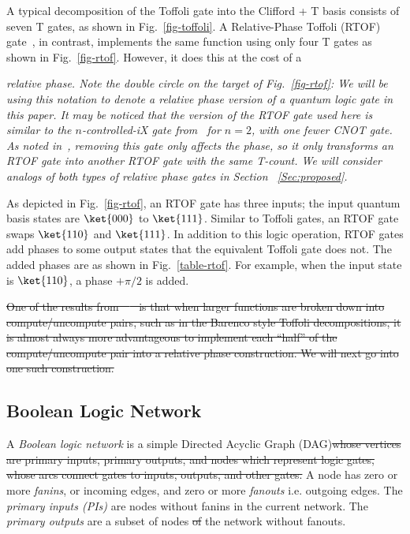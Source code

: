 \documentclass[paper]{ieice}
\providecommand{\DIFadd}[1]{{\protect\color{blue}{#1}}} %
\providecommand{\DIFdel}[1]{{\protect\color{red}\sout{#1}}}                      %
\providecommand{\DIFaddbegin}{} %
\providecommand{\DIFaddend}{} %
\providecommand{\DIFdelbegin}{} %
\providecommand{\DIFdelend}{} %
\newcommand{\DIFscaledelfig}{0.5}
\newlength{\DIFdelgraphicswidth} %
\newlength{\DIFdelgraphicsheight} %
\newcommand{\DIFaddincludegraphics}[2][]{{\color{blue}\fbox{\DIFOincludegraphics[#1]{#2}}}} %
\newcommand{\DIFdelincludegraphics}[2][]{%
\sbox{\DIFdelgraphicsbox}{\DIFOincludegraphics[#1]{#2}}%
\settoboxwidth{\DIFdelgraphicswidth}{\DIFdelgraphicsbox} %
\settoboxtotalheight{\DIFdelgraphicsheight}{\DIFdelgraphicsbox} %
\scalebox{\DIFscaledelfig}{%
\parbox[b]{\DIFdelgraphicswidth}{\usebox{\DIFdelgraphicsbox}\\[-\baselineskip] \rule{\DIFdelgraphicswidth}{0em}}\llap{\resizebox{\DIFdelgraphicswidth}{\DIFdelgraphicsheight}{%
\setlength{\unitlength}{\DIFdelgraphicswidth}%
\begin{picture}(1,1)%
\thicklines\linethickness{2pt} %
{\color[rgb]{1,0,0}\put(0,0){\framebox(1,1){}}}%
{\color[rgb]{1,0,0}\put(0,0){\line( 1,1){1}}}%
{\color[rgb]{1,0,0}\put(0,1){\line(1,-1){1}}}%
\end{picture}%
}\hspace*{3pt}}} %
} %
\DeclareRobustCommand{\DIFaddbegin}{\DIFOaddbegin \let\includegraphics\DIFaddincludegraphics} %
\DeclareRobustCommand{\DIFaddend}{\DIFOaddend \let\includegraphics\DIFOincludegraphics} %
\DeclareRobustCommand{\DIFdelbegin}{\DIFOdelbegin \let\includegraphics\DIFdelincludegraphics} %
\DeclareRobustCommand{\DIFdelend}{\DIFOaddend \let\includegraphics\DIFOincludegraphics} %
\begin{document}
A typical decomposition of the Toffoli gate into the Clifford + T basis
consists of seven T gates, as shown in Fig.~\ref{fig-toffoli}.
A Relative-Phase Toffoli (RTOF) gate~\cite{bib-rtof-maslov}, in contrast,
implements the same function using only four T gates as shown in
Fig.~\ref{fig-rtof}. However, it does this at the cost of a {\it{relative phase}.
Note the double circle on the target of Fig.~\ref{fig-rtof}: We will be
using this notation to denote a relative phase version of a quantum logic
gate in this paper. It may be noticed that the version of the RTOF gate used here is similar to the $n$-controlled-iX gate
from~\cite{bib-selinger-rtof} for $n=2$, with one fewer CNOT gate. As
noted in~\cite{bib-rtof-maslov}, removing this gate only affects the
phase, so it only transforms an RTOF gate into another RTOF gate with
the same T-count. We will consider analogs of both types of
relative phase gates in Section ~\ref{Sec:proposed}.

As depicted in Fig.~\ref{fig-rtof}, an RTOF gate has three inputs; the input quantum basis states are $\ket{000}$
to $\ket{111}$. Similar to Toffoli gates, an RTOF gate swaps $\ket{110}$ and $\ket{111}$. In addition to this
logic operation, RTOF gates add phases to some output states that the equivalent Toffoli gate does not. The added
phases are as shown in Fig.~\ref{table-rtof}. For example, when the input state is $\ket{110}$, a phase $+\pi/2$ is
added.

\DIFdelbegin \DIFdel{One of the results from~\mbox{%
\cite{bib-rtof-maslov} }\hskip0pt%
is that when larger functions are broken down into compute/uncompute pairs, such as in the Barenco style Toffoli decompositions, it is almost always more advantageous to implement each ``half'' of the compute/uncompute pair into a relative phase construction. We will next go into one such construction.
}\DIFdelend %
\subsection{Boolean Logic Network}

A {\it Boolean logic network} is a simple Directed Acyclic Graph (DAG)\DIFdelbegin \DIFdel{whose vertices are primary inputs, primary outputs, and nodes which represent logic gates, whose arcs connect gates to inputs, outputs, and other gates.
}%
\DIFdelend \DIFaddbegin \DIFadd{.
}\DIFaddend A node has zero or more {\it fanins}, or incoming edges, and zero or more {\it fanouts} i.e. outgoing edges. The {\it primary inputs (PIs)} are nodes without fanins in the current network. The {\it primary outputs} are a subset of nodes \DIFdelbegin \DIFdel{of }\DIFdelend \DIFaddbegin \DIFadd{in }\DIFaddend the network without fanouts. 

}
\end{document}
